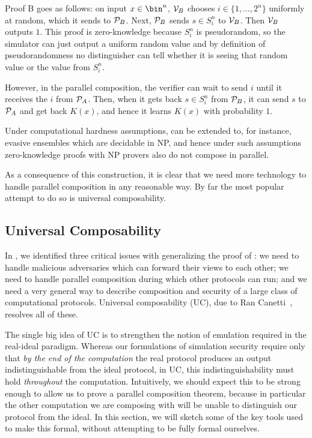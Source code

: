 Proof B goes as follows: on input $x\in\bin^n$, $\mathcal{V}_B$ chooses
$i\in\{1,\dots,2^n\}$ uniformly at random, which it sends to $\mathcal{P}_B$. Next,
$\mathcal{P}_B$ sends $s\in S^n_i$ to $\mathcal{V}_B$. Then $\mathcal{V}_B$ outputs $1$. 
This proof is zero-knowledge because $S^n_i$ is pseudorandom, so the simulator can
just output a uniform random value and by definition of pseudorandomness no
distinguisher can tell whether it is seeing that random value or the value from
$S^n_i$.

However, in the parallel composition, the verifier can wait to send $i$ until it
receives the $i$ from $\mathcal{P}_A$. Then, when it gets back $s\in S^n_i$ from
$\mathcal{P}_B$, it can send $s$ to $\mathcal{P}_A$ and get back $K(x)$, and hence it learns
$K(x)$ with probability $1$.

Under computational hardness assumptions, 
can be extended to,
for instance, evasive ensembles which are decidable in NP, and hence under such
assumptions zero-knowledge proofs with NP provers also do not compose in
parallel.

As a consequence of this construction, it is clear that we need more technology
to handle parallel composition in any reasonable way. By far the most popular
attempt to do so is universal composability.

\subsection{Universal Composability}

In
,
we identified three critical issues with generalizing the proof of
:
we need to handle malicious adversaries which can forward their views to each
other; we need to handle parallel composition during which other protocols can
run; and we need a very general way to describe composition and security of a
large class of computational protocols. Universal composability (UC), due to Ran
Canetti~\cite{canetti-2000,canetti-2020}, resolves all of these.

The single big idea of UC is to strengthen the notion of emulation required in
the real-ideal paradigm. Whereas our formulations of simulation security require
only that \emph{by the end of the computation} the real protocol produces an output
indistinguishable from the ideal protocol, in UC, this indistinguishability must
hold \emph{throughout} the computation. Intuitively, we should expect this to be
strong enough to allow us to prove a parallel composition theorem, because
in particular the other computation we are composing with will be unable to
distinguish our protocol from the ideal. In this section, we will sketch some of
the key tools used to make this formal, without attempting to be fully formal
ourselves.

